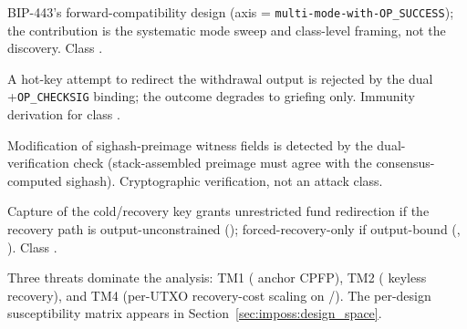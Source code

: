 {\begin{description}[leftmargin=1.3em,itemsep=0pt,parsep=0pt,topsep=2pt]
    BIP-443's forward-compatibility design (axis \axopsurf{} =
    \texttt{multi-mode-with-OP\_SUCCESS}); the contribution is the
    systematic mode sweep and class-level framing, not the discovery.
    Class \classmode{}.
  \item[TM9 (hot-key redirection).] A \catcsfs{} hot-key attempt to
    redirect the withdrawal output is rejected by the dual
    \opcsfs{}+\texttt{OP\_CHECKSIG} binding; the outcome degrades to
    griefing only. Immunity derivation for class \classhot{}.
  \item[TM10 (witness tampering).] Modification of \catcsfs{}
    sighash-preimage witness fields is detected by the
    dual-verification check (stack-assembled preimage must agree with
    the consensus-computed sighash). Cryptographic verification,
    not an attack class.
  \item[TM11 (cold-key theft).] Capture of the cold/recovery key
    grants unrestricted fund redirection if the recovery path is
    output-unconstrained (\catcsfs{}); forced-recovery-only if
    output-bound (\opctv{}, \opvault{}). Class \classcold{}.
\end{description}
}

Three threats dominate the analysis: TM1 (\opctv{} anchor CPFP), TM2
(\opccv{} keyless recovery), and TM4 (per-UTXO recovery-cost scaling
on \opccv{}/\opvault{}). The per-design susceptibility matrix appears
in Section~\ref{sec:imposs:design_space}.

\providecommand{\todo}[2][]{\textbf{[TODO: #2]}}
